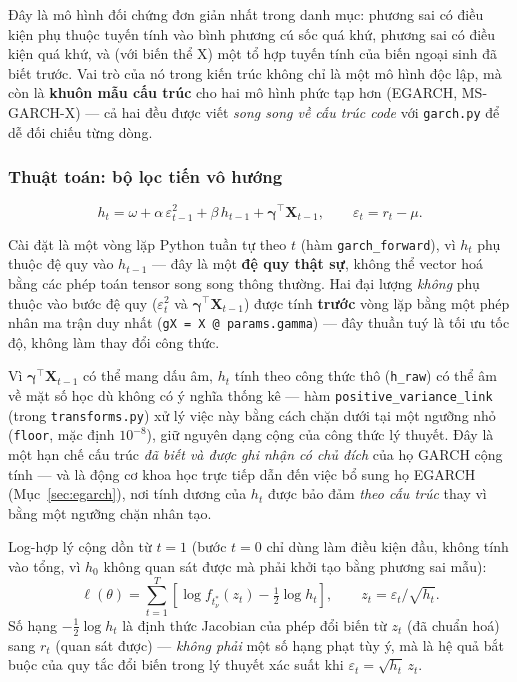 \documentclass[11pt,a4paper]{article}
\newcommand{\code}[1]{\texttt{#1}}
\newcommand{\file}[1]{\texttt{#1}}
\begin{document}
Đây là mô hình đối chứng đơn giản nhất trong danh mục: phương sai có điều kiện phụ
thuộc tuyến tính vào bình phương cú sốc quá khứ, phương sai có điều kiện quá khứ, và
(với biến thể X) một tổ hợp tuyến tính của biến ngoại sinh đã biết trước. Vai trò của
nó trong kiến trúc không chỉ là một mô hình độc lập, mà còn là \textbf{khuôn mẫu cấu
trúc} cho hai mô hình phức tạp hơn (EGARCH, MS-GARCH-X) --- cả hai đều được viết
\emph{song song về cấu trúc code} với \code{garch.py} để dễ đối chiếu từng dòng.

\subsubsection{Thuật toán: bộ lọc tiến vô hướng}

\begin{equation}
h_t = \omega + \alpha\,\varepsilon_{t-1}^2 + \beta\, h_{t-1} + \boldsymbol\gamma^\top
\mathbf X_{t-1}, \qquad \varepsilon_t = r_t - \mu.
\end{equation}

Cài đặt là một vòng lặp Python tuần tự theo $t$ (hàm \code{garch\_forward}), vì $h_t$
phụ thuộc đệ quy vào $h_{t-1}$ --- đây là một \textbf{đệ quy thật sự}, không thể vector
hoá bằng các phép toán tensor song song thông thường. Hai đại lượng \emph{không} phụ
thuộc vào bước đệ quy ($\varepsilon_t^2$ và $\boldsymbol\gamma^\top\mathbf X_{t-1}$)
được tính \textbf{trước} vòng lặp bằng một phép nhân ma trận duy nhất (\code{gX = X @
params.gamma}) --- đây thuần tuý là tối ưu tốc độ, không làm thay đổi công thức.

Vì $\boldsymbol\gamma^\top\mathbf X_{t-1}$ có thể mang dấu âm, $h_t$ tính theo công
thức thô (\code{h\_raw}) có thể âm về mặt số học dù không có ý nghĩa thống kê --- hàm
\code{positive\_variance\_link} (trong \file{transforms.py}) xử lý việc này bằng
cách chặn dưới tại một ngưỡng nhỏ (\code{floor}, mặc định $10^{-8}$), giữ nguyên dạng
cộng của công thức lý thuyết. Đây là một hạn chế cấu trúc \emph{đã biết và được ghi
nhận có chủ đích} của họ GARCH cộng tính --- và là động cơ khoa học trực tiếp dẫn đến
việc bổ sung họ EGARCH (Mục~\ref{sec:egarch}), nơi tính dương của $h_t$ được bảo đảm
\emph{theo cấu trúc} thay vì bằng một ngưỡng chặn nhân tạo.

Log-hợp lý cộng dồn từ $t=1$ (bước $t=0$ chỉ dùng làm điều kiện đầu, không tính vào
tổng, vì $h_0$ không quan sát được mà phải khởi tạo bằng phương sai mẫu):
\begin{equation}
\ell(\theta) = \sum_{t=1}^{T} \left[\log f_{t^*_\nu}(z_t) - \tfrac12\log h_t\right],
\qquad z_t = \varepsilon_t/\sqrt{h_t}.
\end{equation}
Số hạng $-\tfrac12\log h_t$ là định thức Jacobian của phép đổi biến từ $z_t$ (đã
chuẩn hoá) sang $r_t$ (quan sát được) --- \emph{không phải} một số hạng phạt tùy ý,
mà là hệ quả bắt buộc của quy tắc đổi biến trong lý thuyết xác suất khi
$\varepsilon_t = \sqrt{h_t}\,z_t$.
\end{document}
